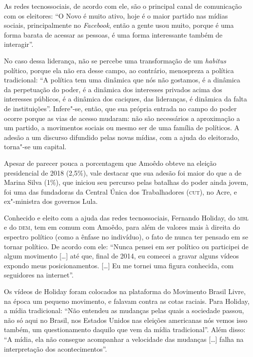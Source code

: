 As redes tecnossociais, de acordo com ele, são o principal canal de
comunicação com os eleitores: ``O Novo é muito ativo, hoje é o maior
partido nas mídias sociais, principalmente no \emph{Facebook}, então a
gente usou muito, porque é uma forma barata de acessar as pessoas, é uma
forma interessante também de interagir''.

No caso dessa liderança, não se percebe uma transformação de um
\emph{habitus} político, porque ela não era desse campo, ao contrário,
menospreza a política tradicional: ``A política tem uma dinâmica que nós
não gostamos, é a dinâmica da perpetuação do poder, é a dinâmica dos
interesses privados acima dos interesses públicos, é a dinâmica dos
caciques, das lideranças, é dinâmica da falta de instituições''.
Infere"-se, então, que sua própria entrada no campo do poder ocorre
porque as vias de acesso mudaram: não são necessários a aproximação a um
partido, a movimentos sociais ou mesmo ser de uma família de políticos.
A adesão a um discurso difundido pelas novas mídias, com a ajuda do
eleitorado, torna"-se um capital.

Apesar de parecer pouca a porcentagem que Amoêdo obteve na eleição
presidencial de 2018 (2,5\%), vale destacar que sua adesão foi maior do
que a de Marina Silva (1\%), que iniciou seu percurso pelas batalhas do
poder ainda jovem, foi uma das fundadoras da Central Única dos
Trabalhadores (\textsc{cut}), no Acre, e ex"-ministra dos governos Lula.

Conhecido e eleito com a ajuda das redes tecnossociais, Fernando
Holiday, do \textsc{mbl} e do \textsc{dem}, tem em comum com Amoêdo, para além de valores
mais à direita do espectro político (como a ênfase no indivíduo), o fato
de nunca ter pensado em se tornar político. De acordo com ele: ``Nunca
pensei em ser político ou participei de algum movimento {[}\ldots{}{]} até
que, final de 2014, eu comecei a gravar alguns vídeos expondo meus
posicionamentos. {[}\ldots{}{]} Eu me tornei uma figura conhecida, com
seguidores na internet''.

Os vídeos de Holiday foram colocados na plataforma do Movimento Brasil
Livre, na época um pequeno movimento, e falavam contra as cotas raciais.
Para Holiday, a mídia tradicional: ``Não entendeu as mudanças pelas
quais a sociedade passou, não só aqui no Brasil, nos Estados Unidos nas
eleições americanas nós vemos isso também, um questionamento daquilo que
vem da mídia tradicional''. Além disso: ``A mídia, ela não consegue
acompanhar a velocidade das mudanças {[}\ldots{}{]} falha na interpretação
dos acontecimentos''.

